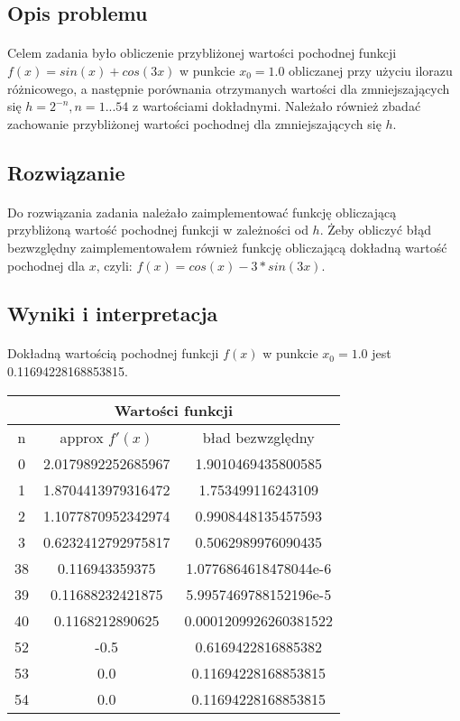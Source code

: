 \documentclass[a4paper]{article}
\begin{document}
\subsection{Opis problemu}
\paragraph{}
Celem zadania było obliczenie przybliżonej wartości pochodnej funkcji $f(x)= sin(x) + cos(3x)$ w punkcie $x_0 = 1.0$ obliczanej przy użyciu ilorazu różnicowego, a następnie porównania otrzymanych wartości dla zmniejszających się $h = 2^{-n}, n = 1...54$ z wartościami dokładnymi. Należało również zbadać zachowanie przybliżonej wartości pochodnej dla zmniejszających się $h$.
\subsection{Rozwiązanie}
\paragraph{}
Do rozwiązania zadania należało zaimplementować funkcję obliczającą przybliżoną wartość pochodnej funkcji w zależności od $h$. Żeby obliczyć błąd bezwzględny zaimplementowałem również funkcję obliczającą dokładną wartość pochodnej dla $x$, czyli: $f(x) = cos(x) - 3 * sin(3x)$.

\subsection{Wyniki i interpretacja}
\paragraph{}

Dokładną wartością pochodnej funkcji $f(x)$ w punkcie $x_0 = 1.0$ jest 0.11694228168853815.

\begin{center}
 \begin{tabular}{ ||c | c | c ||  }
 \hline
 \multicolumn{3}{|c|}{Wartości funkcji} \\
 \hline
 n & approx $f'(x)$ & bład bezwzględny\\
 0 & 2.0179892252685967 & 1.9010469435800585\\
 1 & 1.8704413979316472 & 1.753499116243109\\
 2 & 1.1077870952342974 & 0.9908448135457593\\
 3 & 0.6232412792975817 & 0.5062989976090435\\
 38 & 0.116943359375 & 1.0776864618478044e-6\\
 39 & 0.11688232421875 & 5.9957469788152196e-5\\
 40 & 0.1168212890625 & 0.0001209926260381522\\
 52 & -0.5 & 0.6169422816885382\\
 53 &  0.0 & 0.11694228168853815\\
 54 &  0.0 & 0.11694228168853815\\
 \hline

\end{tabular}
\end{center}
\end{document}
